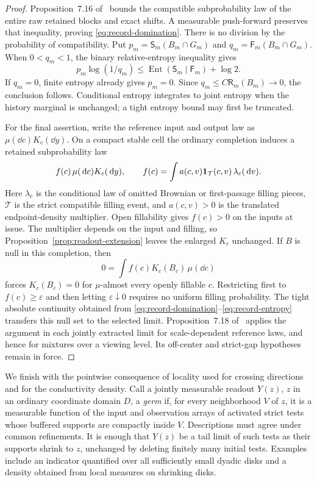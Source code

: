 \begin{proof}
Proposition~7.16 of~\cite{P} bounds the compatible subprobability law
of the entire raw retained blocks and exact shifts.  A measurable
push-forward preserves that inequality, proving
\eqref{eq:record-domination}.  There is no division by the probability
of compatibility.  Put \(p_m=\mathsf S_m(B_m\cap G_m)\) and
\(q_m=\mathsf F_m(B_m\cap G_m)\).  When \(0<q_m<1\), the binary
relative-entropy inequality gives
\begin{equation}
 p_m\log(1/q_m)
 \le \operatorname{Ent}(\mathsf S_m\mid\mathsf F_m)+\log2 .
 \label{eq:record-entropy}
\end{equation}
If \(q_m=0\), finite entropy already gives \(p_m=0\).  Since
\(q_m\le C\mathsf R_m(B_m)\to0\), the conclusion follows.
Conditional entropy integrates to joint entropy when the history
marginal is unchanged; a tight entropy bound may first be truncated.

For the final assertion, write the reference input and output law as
\(\mu(\dd c)K_c(\dd y)\).  On a compact stable cell the ordinary
completion induces a retained subprobability law
\begin{equation}
 f(c)\,\mu(\,\mathrm d c)K_c(\,\mathrm d y),\qquad
 f(c)=\int a(c,v)\mathbf 1_{\mathcal T}(c,v)\,\lambda_c(\,\mathrm d v).
 \label{eq:fillable-density}
\end{equation}
Here \(\lambda_c\) is the conditional law of omitted Brownian or
first-passage filling pieces, \(\mathcal T\) is the strict compatible
filling event, and \(a(c,v)>0\) is the translated endpoint-density
multiplier.  Open fillability gives \(f(c)>0\) on the inputs at issue.
The multiplier depends on the input and filling, so
Proposition~\ref{prop:readout-extension} leaves the enlarged \(K_c\)
unchanged.  If \(B\) is null in this completion, then
\[
 0=\int f(c)K_c(B_c)\,\mu(\dd c)
\]
forces \(K_c(B_c)=0\) for \(\mu\)-almost every openly fillable \(c\).
Restricting first to \(f(c)\ge\varepsilon\) and then letting
\(\varepsilon\downarrow0\) requires no uniform filling probability.
The tight absolute continuity obtained from
\eqref{eq:record-domination}--\eqref{eq:record-entropy} transfers this
null set to the selected limit.  Proposition~7.18 of~\cite{P}
applies the argument in each jointly extracted limit for
scale-dependent reference laws, and hence for mixtures over a viewing
level.  Its off-center and strict-gap hypotheses remain in force.
\end{proof}

We finish with the pointwise consequence of locality used for crossing
directions and for the conductivity density.  Call a jointly
measurable readout \(Y(z)\), \(z\) in an ordinary coordinate domain
\(D\), a \emph{germ} if, for every neighborhood \(V\) of \(z\), it is
a measurable function of the input and observation arrays of activated
strict tests whose buffered supports are compactly inside \(V\).
Descriptions must agree under common refinements.  It is enough that
\(Y(z)\) be a tail limit of such tests as their supports shrink to
\(z\), unchanged by deleting finitely many initial tests.  Examples
include an indicator quantified over all sufficiently small dyadic
disks and a density obtained from local measures on shrinking disks.

